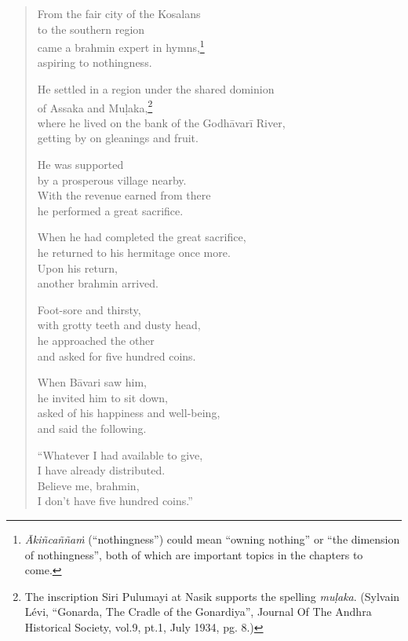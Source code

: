 \documentclass[12pt,openany]{book}%
\begin{document}
\begin{verse}%
From the fair city of the Kosalans \\
to the southern region \\
came a brahmin expert in hymns,\footnote{\textit{\textsanskrit{Ākiñcaññaṁ}} (“nothingness”) could mean “owning nothing” or “the dimension of nothingness”, both of which are important topics in the chapters to come. } \\
aspiring to nothingness. 

He settled in a region under the shared dominion \\
of Assaka and \textsanskrit{Muḷaka},\footnote{The inscription Siri Pulumayi at Nasik supports the spelling \textit{\textsanskrit{muḷaka}}. (Sylvain Lévi, “Gonarda, The Cradle of the Gonardiya”, Journal Of The Andhra Historical Society, vol.9, pt.1, July 1934, pg. 8.) } \\
where he lived on the bank of the \textsanskrit{Godhāvarī} River, \\
getting by on gleanings and fruit. 

He was supported \\
by a prosperous village nearby. \\
With the revenue earned from there \\
he performed a great sacrifice. 

When he had completed the great sacrifice, \\
he returned to his hermitage once more. \\
Upon his return, \\
another brahmin arrived. 

Foot-sore and thirsty, \\
with grotty teeth and dusty head, \\
he approached the other \\
and asked for five hundred coins. 

When \textsanskrit{Bāvari} saw him, \\
he invited him to sit down, \\
asked of his happiness and well-being, \\
and said the following. 

“Whatever I had available to give, \\
I have already distributed. \\
Believe me, brahmin, \\
I don’t have five hundred coins.” 


\end{verse}
\end{document}

